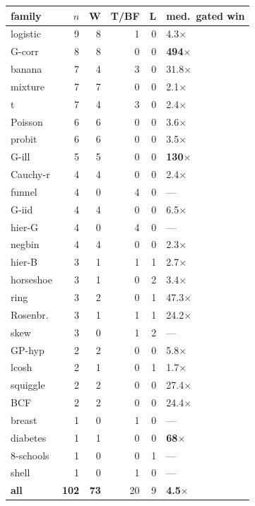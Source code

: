 \setlength{\tabcolsep}{4pt}
\begin{tabular}{lrrrrl}
\toprule
family & $n$ & W & T/BF & L & med.\ gated win\\
\midrule
logistic & 9 & 8 & 1 & 0 & 4.3$\times$\\
G-corr & 8 & 8 & 0 & 0 & \textbf{494$\times$}\\
banana & 7 & 4 & 3 & 0 & 31.8$\times$\\
mixture & 7 & 7 & 0 & 0 & 2.1$\times$\\
t & 7 & 4 & 3 & 0 & 2.4$\times$\\
Poisson & 6 & 6 & 0 & 0 & 3.6$\times$\\
probit & 6 & 6 & 0 & 0 & 3.5$\times$\\
G-ill & 5 & 5 & 0 & 0 & \textbf{130$\times$}\\
Cauchy-r & 4 & 4 & 0 & 0 & 2.4$\times$\\
funnel & 4 & 0 & 4 & 0 & ---\\
G-iid & 4 & 4 & 0 & 0 & 6.5$\times$\\
hier-G & 4 & 0 & 4 & 0 & ---\\
negbin & 4 & 4 & 0 & 0 & 2.3$\times$\\
hier-B & 3 & 1 & 1 & 1 & 2.7$\times$\\
horseshoe & 3 & 1 & 0 & 2 & 3.4$\times$\\
ring & 3 & 2 & 0 & 1 & 47.3$\times$\\
Rosenbr. & 3 & 1 & 1 & 1 & 24.2$\times$\\
skew & 3 & 0 & 1 & 2 & ---\\
GP-hyp & 2 & 2 & 0 & 0 & 5.8$\times$\\
lcosh & 2 & 1 & 0 & 1 & 1.7$\times$\\
squiggle & 2 & 2 & 0 & 0 & 27.4$\times$\\
BCF & 2 & 2 & 0 & 0 & 24.4$\times$\\
breast & 1 & 0 & 1 & 0 & ---\\
diabetes & 1 & 1 & 0 & 0 & \textbf{68$\times$}\\
8-schools & 1 & 0 & 0 & 1 & ---\\
shell & 1 & 0 & 1 & 0 & ---\\
\midrule
\textbf{all} & \textbf{102} & \textbf{73} & 20 & 9 & \textbf{4.5$\times$}\\
\bottomrule
\end{tabular}